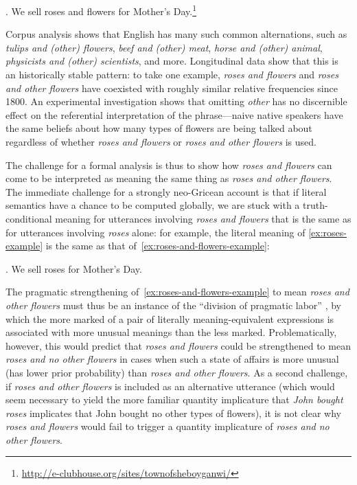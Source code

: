 \documentclass[11pt]{article}
\begin{document}
\ex. We sell roses and flowers for Mother's
Day.\footnote{\url{http://e-clubhouse.org/sites/townofsheboyganwi/}} \label{ex:roses-and-flowers-example}

Corpus analysis shows that English has many such common alternations,
such as \emph{tulips and (other) flowers}, \emph{beef and (other)
  meat}, \emph{horse and (other) animal}, \emph{physicists and (other)
  scientists}, and more.  Longitudinal data show that this is an
historically stable pattern: to take one example, \emph{roses and
  flowers} and \emph{roses and other flowers} have coexisted with
roughly similar relative frequencies since 1800.  An experimental
investigation shows that omitting \emph{other} has no discernible
effect on the referential interpretation of the phrase---naive native
speakers have the same beliefs about how many types of flowers are
being talked about regardless of whether \emph{roses and flowers} or
\emph{roses and other flowers} is used.

The challenge for a formal analysis is thus to show how \emph{roses
  and flowers} can come to be interpreted as meaning the same thing as
\emph{roses and other flowers}.  The immediate challenge for a
strongly neo-Gricean account is that if literal semantics have a
chance to be computed globally, we are stuck with a truth-conditional
meaning for utterances involving \emph{roses and flowers} that is the
same as for utterances involving \emph{roses} alone: for example, the
literal meaning of \ref{ex:roses-example} is the same as that
of~\ref{ex:roses-and-flowers-example}:

\ex. We sell roses for Mother's Day. \label{ex:roses-example}

\noindent
The pragmatic strengthening of~\ref{ex:roses-and-flowers-example}  to mean \emph{roses and other 
  flowers} must thus be an instance of the ``division of pragmatic
labor'' \citep{horn:1984}, by which the more marked of a pair of
literally meaning-equivalent expressions is associated with more
unusual meanings than the less marked.  Problematically, however, this
would predict that \emph{roses and flowers} could be strengthened to
mean \emph{roses and no other flowers} in cases when such a state of
affairs is more unusual (has lower prior probability) than \emph{roses
  and other flowers}.  As a second challenge, if \emph{roses and other
  flowers} is included as an alternative utterance (which would seem
necessary to yield the more familiar quantity implicature that
\emph{John bought roses} implicates that John bought no other types of
flowers), it is not clear why \emph{roses and flowers} would fail to
trigger a quantity implicature of \emph{roses and no other flowers}.
\end{document}
